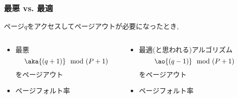 \documentclass[12pt,dvipdfmx]{beamer}
\begin{document}
\begin{frame}
  \frametitle{最悪 vs. 最適}
  ページ$q$をアクセスしてページアウトが必要になったとき, 
  
  \begin{columns}
    \begin{column}{0.5\textwidth}
      \begin{itemize}
      \item 最悪
        \[ \aka{(q+1)} \mod (P+1) \]
        をページアウト
      \item<8-> ページフォルト率 
      \end{itemize}
    \end{column}
    \begin{column}{0.5\textwidth}
      \begin{itemize}
      \item 最適(と思われる)アルゴリズム
        \[ \ao{(q-1)} \mod (P+1) \]
        をページアウト
      \item<17-> ページフォルト率 
      \end{itemize}
    \end{column}
  \end{columns}
  

\end{frame}
\end{document}
